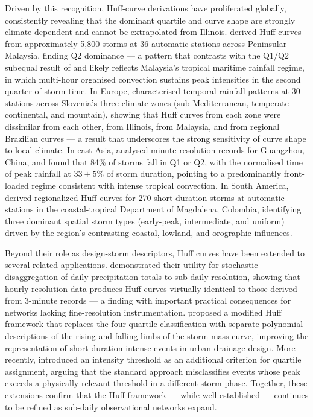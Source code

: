 \documentclass[a4paper,fleqn]{cas-sc}
\begin{document}
Driven by this recognition, Huff-curve derivations have proliferated
globally, consistently revealing that the dominant quartile and
curve shape are strongly climate-dependent and cannot be extrapolated
from Illinois. \citet{AzliRao2010} derived Huff curves from
approximately 5,800 storms at 36 automatic stations across Peninsular
Malaysia, finding Q2 dominance — a pattern that contrasts with the
Q1/Q2 subequal result of \citet{Huff1967} and likely reflects
Malaysia's tropical maritime rainfall regime, in which multi-hour
organised convection sustains peak intensities in the second quarter
of storm time. In Europe, \citet{Dolsak2016} characterised temporal
rainfall patterns at 30 stations across Slovenia's three climate
zones (sub-Mediterranean, temperate continental, and mountain), showing
that Huff curves from each zone were dissimilar from each other, from
Illinois, from Malaysia, and from regional Brazilian curves — a result
that underscores the strong sensitivity of curve shape to local
climate. In east Asia, \citet{Liang2017} analysed minute-resolution
records for Guangzhou, China, and found that 84\% of storms fall in
Q1 or Q2, with the normalised time of peak rainfall at $33 \pm 5\%$
of storm duration, pointing to a predominantly front-loaded regime
consistent with intense tropical convection. In South America,
\citet{Corrales2026} derived regionalized Huff curves for 270
short-duration storms at automatic stations in the coastal-tropical
Department of Magdalena, Colombia, identifying three dominant spatial
storm types (early-peak, intermediate, and uniform) driven by the
region's contrasting coastal, lowland, and orographic influences.

Beyond their role as design-storm descriptors, Huff curves have been
extended to several related applications. \citet{Bonta2004}
demonstrated their utility for stochastic disaggregation of daily
precipitation totals to sub-daily resolution, showing that
hourly-resolution data produces Huff curves virtually identical to
those derived from 3-minute records — a finding with important
practical consequences for networks lacking fine-resolution
instrumentation. \citet{Liang2017} proposed a modified Huff
framework that replaces the four-quartile classification with
separate polynomial descriptions of the rising and falling limbs of
the storm mass curve, improving the representation of short-duration
intense events in urban drainage design. More recently,
\citet{Dunkerley2022} introduced an intensity threshold as an
additional criterion for quartile assignment, arguing that the
standard approach misclassifies events whose peak exceeds a
physically relevant threshold in a different storm phase.
Together, these extensions confirm that the Huff framework — while
well established — continues to be refined as sub-daily observational
networks expand.
\end{document}
